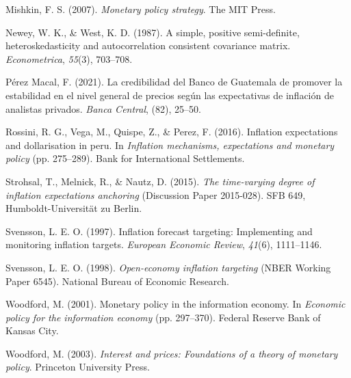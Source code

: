 \documentclass[
  10.5pt,
  letterpaper,
  twocolumn]{article}
\newlength{\cslhangindent}
\newenvironment{CSLReferences}[2] %
 {\begin{list}{}{%
  \setlength{\itemindent}{0pt}
  \setlength{\leftmargin}{0pt}
  \setlength{\parsep}{0pt}
  \ifodd #1
   \setlength{\leftmargin}{\cslhangindent}
   \setlength{\itemindent}{-1\cslhangindent}
  \fi
  \setlength{\itemsep}{#2\baselineskip}}}
 {\end{list}}
\begin{document}
\begin{CSLReferences}{1}{0}
Mishkin, F. S. (2007). \emph{Monetary policy strategy}. The MIT Press.

Newey, W. K., \& West, K. D. (1987). A simple, positive semi-definite,
heteroskedasticity and autocorrelation consistent covariance matrix.
\emph{Econometrica}, \emph{55}(3), 703--708.

Pérez Macal, F. (2021). La credibilidad del {Banco de Guatemala} de
promover la estabilidad en el nivel general de precios según las
expectativas de inflación de analistas privados. \emph{Banca Central},
(82), 25--50.

Rossini, R. G., Vega, M., Quispe, Z., \& Perez, F. (2016). Inflation
expectations and dollarisation in peru. In \emph{Inflation mechanisms,
expectations and monetary policy} (pp. 275--289). Bank for International
Settlements.

Strohsal, T., Melnick, R., \& Nautz, D. (2015). \emph{The time-varying
degree of inflation expectations anchoring} (Discussion Paper 2015-028).
SFB 649, Humboldt-Universität zu Berlin.

Svensson, L. E. O. (1997). Inflation forecast targeting: Implementing
and monitoring inflation targets. \emph{European Economic Review},
\emph{41}(6), 1111--1146.

Svensson, L. E. O. (1998). \emph{Open-economy inflation targeting} (NBER
Working Paper 6545). National Bureau of Economic Research.

Woodford, M. (2001). Monetary policy in the information economy. In
\emph{Economic policy for the information economy} (pp. 297--370).
Federal Reserve Bank of Kansas City.

Woodford, M. (2003). \emph{Interest and prices: Foundations of a theory
of monetary policy}. Princeton University Press.

\end{CSLReferences}
\end{document}
